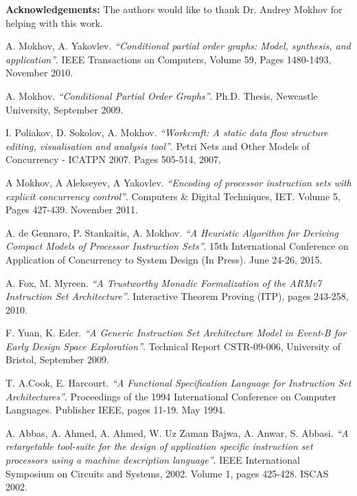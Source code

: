 \documentclass[conference]{IEEEtran}
\begin{document}
\noindent\textbf{Acknowledgements:} The authors would like to thank Dr. Andrey Mokhov for
helping with this work.


\begin{thebibliography}{1}

	A. Mokhov, A. Yakovlev. \emph{``Conditional partial order graphs: Model,
	synthesis, and application''}. IEEE Transactions on Computers, Volume 59,
	Pages 1480-1493, November 2010.
	
	A. Mokhov. \emph{``Conditional Partial Order Graphs''}. Ph.D. Thesis,
	Newcastle University, September 2009.	

	I. Poliakov, D. Sokolov, A. Mokhov. \emph{``Workcraft: A static data flow
	structure editing, visualisation and analysis tool''}. Petri Nets and Other
	Models of Concurrency - ICATPN 2007. Pages 505-514, 2007.
	
	A Mokhov, A Alekseyev, A Yakovlev. \emph{``Encoding of processor instruction
	sets with explicit concurrency control''}. Computers \& Digital Techniques,
	IET. Volume 5, Pages 427-439. November 2011.
	
	A. de Gennaro, P. Stankaitis, A. Mokhov. \emph{``A Heuristic Algorithm for
	Deriving Compact Models of Processor Instruction Sets''}. 15th International
	Conference on Application of Concurrency to System Design (In Press). June
	24-26, 2015.

	A. Fox, M. Myreen. \emph{``A Trustworthy Monadic Formalization of the ARMv7
	Instruction Set Architecture''}. Interactive Theorem Proving (ITP), pages
	243-258, 2010.	
	
	F. Yuan, K. Eder. \emph{``A Generic Instruction Set Architecture Model in
	Event-B for Early Design Space Exploration''}. Technical Report CSTR-09-006,
	University of Bristol, September 2009.

	T. A.Cook, E. Harcourt. \emph{``A Functional Specification Language for
	Instruction Set Architectures''}. Proceedings of the 1994 International
	Conference on Computer Languages. Publisher IEEE, pages 11-19. May 1994.
	
	A. Abbas, A. Ahmed, A. Ahmed, W. Uz Zaman Bajwa, A. Anwar, S. Abbasi. 
	\emph{``A retargetable tool-suite for the design of application specific
	instruction set processors using a machine description language''}. IEEE
	International Symposium on Circuits and Systems, 2002. Volume 1, pages 425-428.
	ISCAS 2002.
	

\end{thebibliography}
\end{document}
